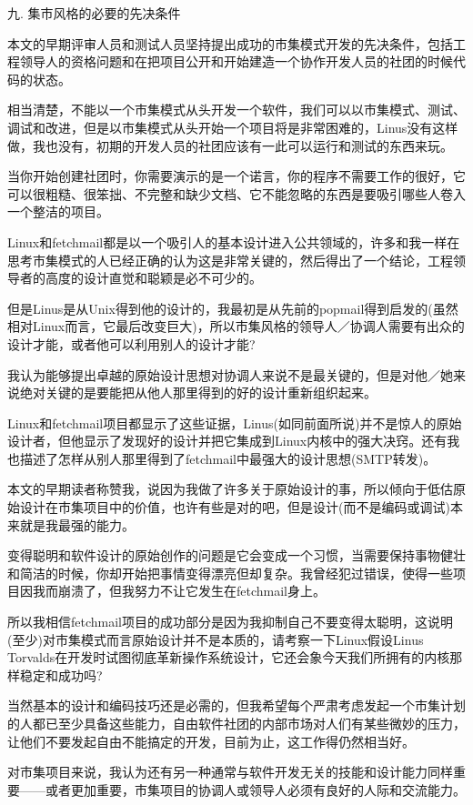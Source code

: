 \documentclass[a4paper,12pt,UTF8,twoside]{ctexbook}
\begin{document}
九. 集市风格的必要的先决条件


本文的早期评审人员和测试人员坚持提出成功的市集模式开发的先决条件，包括工程领导人的资格问题和在把项目公开和开始建造一个协作开发人员的社团的时候代码的状态。


相当清楚，不能以一个市集模式从头开发一个软件，我们可以以市集模式、测试、调试和改进，但是以市集模式从头开始一个项目将是非常困难的，Linus没有这样做，我也没有，初期的开发人员的社团应该有一此可以运行和测试的东西来玩。


当你开始创建社团时，你需要演示的是一个诺言，你的程序不需要工作的很好，它可以很粗糙、很笨拙、不完整和缺少文档、它不能忽略的东西是要吸引哪些人卷入一个整洁的项目。


Linux和fetchmail都是以一个吸引人的基本设计进入公共领域的，许多和我一样在思考市集模式的人已经正确的认为这是非常关键的，然后得出了一个结论，工程领导者的高度的设计直觉和聪颖是必不可少的。


但是Linus是从Unix得到他的设计的，我最初是从先前的popmail得到启发的(虽然相对Linux而言，它最后改变巨大)，所以市集风格的领导人／协调人需要有出众的设计才能，或者他可以利用别人的设计才能?


我认为能够提出卓越的原始设计思想对协调人来说不是最关键的，但是对他／她来说绝对关键的是要能把从他人那里得到的好的设计重新组织起来。


Linux和fetchmail项目都显示了这些证据，Linus(如同前面所说)并不是惊人的原始设计者，但他显示了发现好的设计并把它集成到Linux内核中的强大决窍。还有我也描述了怎样从别人那里得到了fetchmail中最强大的设计思想(SMTP转发)。


本文的早期读者称赞我，说因为我做了许多关于原始设计的事，所以倾向于低估原始设计在市集项目中的价值，也许有些是对的吧，但是设计(而不是编码或调试)本来就是我最强的能力。


变得聪明和软件设计的原始创作的问题是它会变成一个习惯，当需要保持事物健壮和简洁的时候，你却开始把事情变得漂亮但却复杂。我曾经犯过错误，使得一些项目因我而崩溃了，但我努力不让它发生在fetchmail身上。


所以我相信fetchmail项目的成功部分是因为我抑制自己不要变得太聪明，这说明(至少)对市集模式而言原始设计并不是本质的，请考察一下Linux假设Linus Torvalds在开发时试图彻底革新操作系统设计，它还会象今天我们所拥有的内核那样稳定和成功吗?


当然基本的设计和编码技巧还是必需的，但我希望每个严肃考虑发起一个市集计划的人都已至少具备这些能力，自由软件社团的内部市场对人们有某些微妙的压力，让他们不要发起自由不能搞定的开发，目前为止，这工作得仍然相当好。


对市集项目来说，我认为还有另一种通常与软件开发无关的技能和设计能力同样重要——或者更加重要，市集项目的协调人或领导人必须有良好的人际和交流能力。
\end{document}
